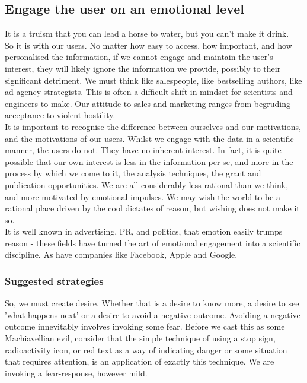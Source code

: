 \subsection{Engage the user on an emotional level}
It is a truism that you can lead a horse to water, but you can't make it drink. \\

So it is with our users.
No matter how easy to access, how important, and how personalised the information, if we cannot engage and maintain the user's interest,
they will likely ignore the information we provide, possibly to their significant detriment.
We must think like salespeople, like bestselling authors, like ad-agency strategists.
This is often a difficult shift in mindset for scientists and engineers to make.
Our attitude to sales and marketing ranges from begruding acceptance to violent hostility. \\

It is important to recognise the difference between ourselves and our motivations, and the motivations of our users. Whilst we engage with the data in a scientific
manner, the users do not. They have no inherent interest. In fact, it is quite possible that our own interest is less in the information per-se, and more in the process
by which we come to it, the analysis techniques, the grant and publication opportunities. We are all considerably less rational than we think, and more motivated by
emotional impulses. We may wish the world to be a rational place driven by the cool dictates of reason, but wishing does not make it so. \\

It is well known in advertising, PR, and politics, that emotion easily trumps reason - these fields have turned the art of emotional engagement into a scientific discipline.
As have companies like Facebook, Apple and Google.

\subsubsection*{Suggested strategies}

So, we must create desire. Whether that is a desire to know more, a desire to see 'what happens next' or a desire to avoid a negative outcome.
Avoiding a negative outcome innevitably involves invoking some fear. Before we cast this as some Machiavellian evil, consider that the simple
technique of using a stop sign, radioactivity icon, or red text as a way of indicating danger or some situation that requires attention, is an
application of exactly this technique. We are invoking a fear-response, however mild. \\

